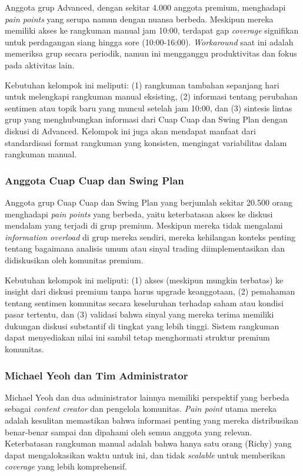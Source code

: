 Anggota grup Advanced, dengan sekitar 4.000 anggota premium, menghadapi \textit{pain points} yang serupa namun dengan nuansa berbeda. Meskipun mereka memiliki akses ke rangkuman manual jam 10:00, terdapat gap \textit{coverage} signifikan untuk perdagangan siang hingga sore (10:00-16:00). \textit{Workaround} saat ini adalah memeriksa grup secara periodik, namun ini mengganggu produktivitas dan fokus pada aktivitas lain.

Kebutuhan kelompok ini meliputi: (1) rangkuman tambahan sepanjang hari untuk melengkapi rangkuman manual eksisting, (2) informasi tentang perubahan sentimen atau topik baru yang muncul setelah jam 10:00, dan (3) sintesis lintas grup yang menghubungkan informasi dari Cuap Cuap dan Swing Plan dengan diskusi di Advanced. Kelompok ini juga akan mendapat manfaat dari standardisasi format rangkuman yang konsisten, mengingat variabilitas dalam rangkuman manual.

\subsubsection{Anggota Cuap Cuap dan Swing Plan}

Anggota grup Cuap Cuap dan Swing Plan yang berjumlah sekitar 20.500 orang menghadapi \textit{pain points} yang berbeda, yaitu keterbatasan akses ke diskusi mendalam yang terjadi di grup premium. Meskipun mereka tidak mengalami \textit{information overload} di grup mereka sendiri, mereka kehilangan konteks penting tentang bagaimana analisis umum atau sinyal trading diimplementasikan dan didiskusikan oleh komunitas premium.

Kebutuhan kelompok ini meliputi: (1) akses (meskipun mungkin terbatas) ke insight dari diskusi premium tanpa harus upgrade keanggotaan, (2) pemahaman tentang sentimen komunitas secara keseluruhan terhadap saham atau kondisi pasar tertentu, dan (3) validasi bahwa sinyal yang mereka terima memiliki dukungan diskusi substantif di tingkat yang lebih tinggi. Sistem rangkuman dapat menyediakan nilai ini sambil tetap menghormati struktur premium komunitas.

\subsubsection{Michael Yeoh dan Tim Administrator}

Michael Yeoh dan dua administrator lainnya memiliki perspektif yang berbeda sebagai \textit{content creator} dan pengelola komunitas. \textit{Pain point} utama mereka adalah kesulitan memastikan bahwa informasi penting yang mereka distribusikan benar-benar sampai dan dipahami oleh semua anggota yang relevan. Keterbatasan rangkuman manual adalah bahwa hanya satu orang (Richy) yang dapat mengalokasikan waktu untuk ini, dan tidak \textit{scalable} untuk memberikan \textit{coverage} yang lebih komprehensif.

